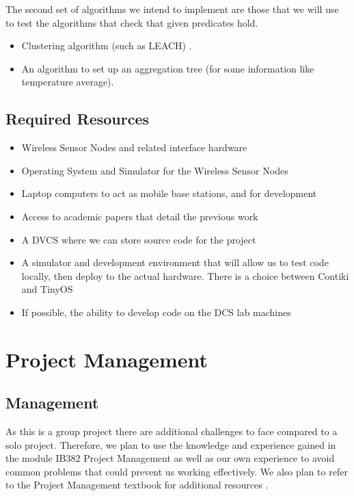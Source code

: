 \documentclass[a4paper]{article}
\begin{document}
The second set of algorithms we intend to implement are those that we will use
to test the algorithms that check that given predicates hold.

\begin{itemize}
	\item Clustering algorithm (such as LEACH) \cite{herbert2007adaptive}.
	\item An algorithm to set up an aggregation tree (for some information
like temperature average). \cite{TankBible}
\end{itemize}

\subsection{Required Resources}
\begin{itemize}
	\item Wireless Sensor Nodes and related interface hardware
	\item Operating System and Simulator for the Wireless Sensor Nodes
	\item Laptop computers to act as mobile base stations, and for
development
	\item Access to academic papers that detail the previous work
	\item A DVCS where we can store source code for the project
	\item A simulator and development environment that will allow us to test
code locally, then deploy to the actual hardware. There is a choice between
Contiki \cite{23839452} and TinyOS \cite{levis2003tossim}
	\item If possible, the ability to develop code on the DCS lab machines
\end{itemize}

\section{Project Management}

\subsection{Management}

As this is a group project there are additional challenges to face compared to a
solo project. Therefore, we plan to use the knowledge and experience gained in
the module IB382 Project Management \cite{IB382} as well as our own experience
to avoid common problems that could prevent us working effectively. We also plan
to refer to the Project Management textbook for additional resources
\cite{PMTextBook}.
\end{document}

